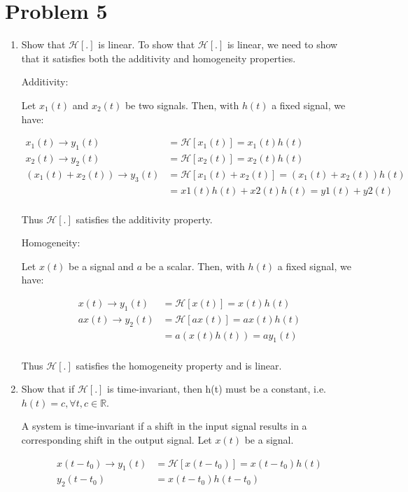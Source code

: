 \documentclass{article}
\begin{document}
\section{Problem 5}
\begin{enumerate}[label=5.\arabic*]
    \item Show that $\mathcal{H}[.]$ is linear.
    To show that $\mathcal{H}[.]$ is linear, we need to show that it satisfies both the additivity and homogeneity properties.

    Additivity:

    Let $x_1(t)$ and $x_2(t)$ be two signals. Then, with $h(t)$ a fixed signal, we have:

    \begin{align*}
        x_1(t) \rightarrow y_1(t) &= \mathcal{H}[x_1(t)] = x_1(t) h(t) \\
        x_2(t) \rightarrow y_2(t) &= \mathcal{H}[x_2(t)] = x_2(t) h(t) \\
        (x_1(t) + x_2(t)) \rightarrow y_3(t) &= \mathcal{H}[x_1(t) + x_2(t)] = (x_1(t) + x_2(t)) h(t) \\
        &= x1(t)h(t) + x2(t)h(t) = y1(t) + y2(t) \\
    \end{align*}

    Thus $\mathcal{H}[.]$ satisfies the additivity property.

    Homogeneity:

    Let $x(t)$ be a signal and $a$ be a scalar. Then, with $h(t)$ a fixed signal, we have:

    \begin{align*}
        x(t) \rightarrow y_1(t) &= \mathcal{H}[x(t)] = x(t) h(t) \\
        ax(t) \rightarrow y_2(t) &= \mathcal{H}[ax(t)] = ax(t) h(t) \\
        &= a(x(t)h(t)) = ay_1(t) \\
    \end{align*}

    Thus $\mathcal{H}[.]$ satisfies the homogeneity property and is linear.

    \item Show that if $\mathcal{H}[.]$ is time-invariant, then h(t) must be a constant, i.e. $h(t) = c, \forall t, c \in \mathbb{R}$.
    
    A system is time-invariant if a shift in the input signal results in a corresponding shift in the output signal. Let $x(t)$ be a signal.

    \begin{align*}
        x(t-t_0) \rightarrow y_1(t) &= \mathcal{H}[x(t-t_0)] = x(t-t_0) h(t) \\
        y_2(t-t_0) &= x(t-t_0) h(t-t_0) \\
    \end{align*}


\end{enumerate}
\end{document}
